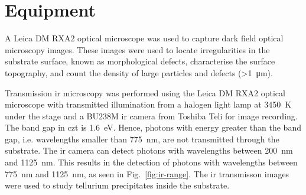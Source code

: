 

\section{Equipment}


A Leica DM RXA2 optical microscope was used to capture dark field optical microscopy images. These images were used to locate irregularities in the substrate surface, known as morphological defects, characterise the surface topography, and count the density of large particles and defects (\SI{>1}{\micro\metre}).

Transmission \ac{ir} microscopy was performed using the Leica DM RXA2 optical microscope with transmitted illumination from a halogen light lamp at \SI{3450}{\kelvin} under the stage and a BU238M \ac{ir} camera from Toshiba Teli for image recording. The band gap in \ac{czt} is \SI{1.6}{\electronvolt}. Hence, photons with energy greater than the band gap, i.e. wavelengths smaller than \SI{775}{\nano\metre}, are not transmitted through the substrate. The \ac{ir} camera can detect photons with wavelengths between \SI{200}{\nano\metre} and \SI{1125}{\nano\metre}. This results in the detection of photons with wavelengths between \SI{775}{\nano\metre} and \SI{1125}{\nano\metre}, as seen in Fig.~\ref{fig:ir-range}. The \ac{ir} transmisson images were used to study tellurium precipitates inside the substrate. %

